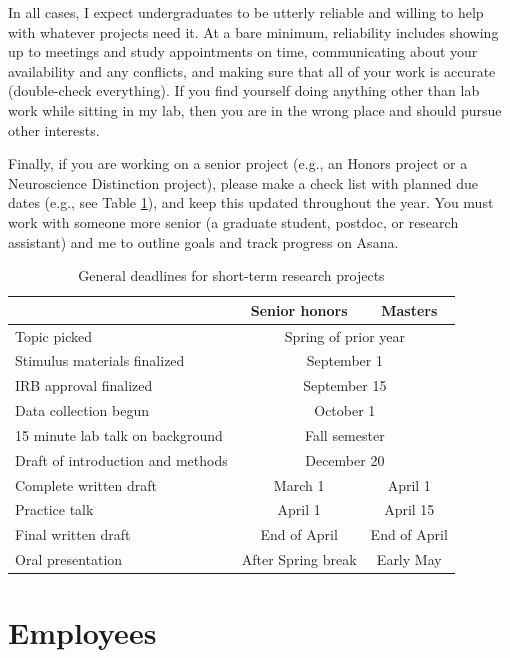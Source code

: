 \documentclass[letterpaper,11pt,oneside]{memoir}
\begin{document}
In all cases, I expect undergraduates to be utterly reliable and willing to help with whatever projects need it. At a bare minimum, reliability includes showing up to meetings and study appointments on time, communicating about your availability and any conflicts, and making sure that all of your work is accurate (double-check everything). If you find yourself doing anything other than lab work while sitting in my lab, then you are in the wrong place and should pursue other interests.

Finally, if you are working on a senior project (e.g., an Honors project or a Neuroscience Distinction project), please make a check list with planned due dates (e.g., see Table \ref{table:deadlines}), and keep this updated throughout the year. You must work with someone more senior (a graduate student, postdoc, or research assistant) and me to outline goals and track progress on Asana.

\begin{table}
\centering
\caption{General deadlines for short-term research projects}
\begin{tabular}{lcc}
\toprule
& Senior honors & Masters\\
\midrule
Topic picked& \multicolumn{2}{c}{Spring of prior year}\\
Stimulus materials finalized& \multicolumn{2}{c}{September 1}\\
IRB approval finalized& \multicolumn{2}{c}{September 15}\\
Data collection begun& \multicolumn{2}{c}{October 1}\\
15 minute lab talk on background& \multicolumn{2}{c}{Fall semester}\\
Draft of introduction and methods& \multicolumn{2}{c}{December 20}\\
Complete written draft& March 1& April 1\\
Practice talk& April 1 & April 15\\
Final written draft& End of April & End of April\\
Oral presentation& After Spring break & Early May\\
\bottomrule
\end{tabular}
\label{table:deadlines}
\end{table}


\section{Employees}
\end{document}
